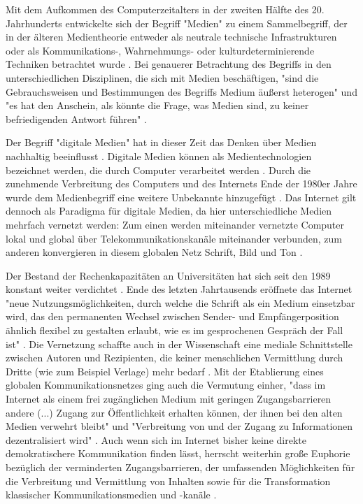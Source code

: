 Mit dem Aufkommen des Computerzeitalters in der zweiten Hälfte des 20. Jahrhunderts entwickelte sich der Begriff "Medien" zu einem Sammelbegriff, der in der älteren Medientheorie entweder als neutrale technische Infrastrukturen oder als Kommunikations-, Wahrnehmungs- oder kulturdeterminierende Techniken betrachtet wurde \cite{beck2005_Kommunikation}. Bei genauerer Betrachtung des Begriffs in den unterschiedlichen Disziplinen, die sich mit Medien beschäftigen, "sind die Gebrauchsweisen und Bestimmungen des Begriffs Medium äußerst heterogen" und "es hat den Anschein, als könnte die Frage, was Medien sind, zu keiner befriedigenden Antwort führen" \cite{Burkhardt_2015}.

Der Begriff "digitale Medien" hat in dieser Zeit das Denken über Medien nachhaltig beeinflusst  \cite{Burkhardt_2015}. Digitale Medien können als Medientechnologien bezeichnet werden, die durch Computer verarbeitet werden \cite{nunning_2013_metzler}. Durch die zunehmende Verbreitung des Computers und des Internets Ende der 1980er Jahre wurde dem Medienbegriff eine weitere Unbekannte hinzugefügt \cite{Burkhardt_2015}. Das Internet gilt dennoch als Paradigma für digitale Medien, da hier unterschiedliche Medien mehrfach vernetzt werden: Zum einen werden miteinander vernetzte Computer lokal und global über Telekommunikationskanäle miteinander verbunden, zum anderen konvergieren in diesem globalen Netz Schrift, Bild und Ton \cite{nunning_2013_metzler}.

Der Bestand der Rechenkapazitäten an Universitäten hat sich seit den 1989 konstant weiter verdichtet \cite{Rutenfranz_1997}. Ende des letzten Jahrtausends eröffnete das Internet "neue Nutzungsmöglichkeiten, durch welche die Schrift als ein Medium einsetzbar wird, das den permanenten Wechsel zwischen Sender- und Empfängerposition ähnlich flexibel zu gestalten erlaubt, wie es im gesprochenen Gespräch der Fall ist" \cite{sandbothe_2000_pragmatische}. Die Vernetzung schaffte auch in der Wissenschaft eine mediale Schnittstelle zwischen Autoren und Rezipienten, die keiner menschlichen Vermittlung durch Dritte (wie zum Beispiel Verlage) mehr bedarf \cite{naeder_2010_open}. Mit der Etablierung eines globalen Kommunikationsnetzes ging auch die Vermutung einher, "dass im Internet als einem frei zugänglichen Medium mit geringen Zugangsbarrieren andere (...) Zugang zur Öffentlichkeit erhalten können, der ihnen bei den alten Medien verwehrt bleibt" und "Verbreitung von und der Zugang zu Informationen dezentralisiert wird" \cite{Gerhards_2007}. Auch wenn sich im Internet bisher keine direkte demokratischere Kommunikation finden lässt, herrscht weiterhin große Euphorie bezüglich der verminderten Zugangsbarrieren, der umfassenden Möglichkeiten für die Verbreitung und Vermittlung von Inhalten sowie für die Transformation klassischer Kommunikationsmedien und -kanäle  \cite{Gerhards_2007}.


